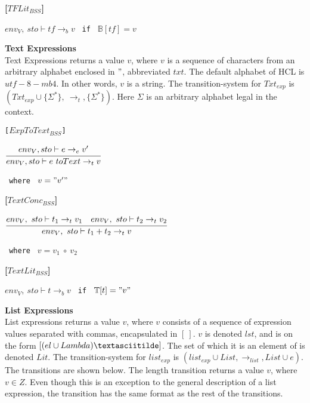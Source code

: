 \textbf{[$TFLit_{BSS}$]}\\
\begin{center}
	\begin{math}
	env_V,\ sto \vdash tf \rightarrow_b v
	\end{math}
	\texttt{ if } $\mathbb{B}[tf] = v$
\end{center}

\textbf{\large{Text Expressions}}\\
Text Expressions returns a value $v$, where $v$ is a sequence of characters from an arbitrary alphabet enclosed in $"$, abbreviated $txt$.
The default alphabet of HCL is $utf-8-mb4$.
In other words, $v$ is a string.
The transition-system for $Txt_{exp}$ is $(Txt_{exp} \cup \{\Sigma^*\},\ \rightarrow_t, \{\Sigma^*\})$.
Here $\Sigma$ is an arbitrary alphabet legal in the context.

\texttt{[$ExpToText_{BSS}$]}\\
\begin{center}
	\begin{math}
	\cfrac
	{env_V, sto \vdash e \rightarrow_{e} v'}
	{env_V, sto \vdash e\ toText \rightarrow_{t} v}
	\end{math}
	
	\texttt{ where } $v = "v'"$
\end{center}

\textbf{[$TextConc_{BSS}$]}\\
\begin{center}
	\begin{math}
	\cfrac
		{env_V,\ sto \vdash t_1 \rightarrow_t v_1 \quad env_V,\ sto \vdash t_2 \rightarrow_t v_2}
		{env_V,\ sto \vdash t_1 + t_2 \rightarrow_t v}
	\end{math}
	
	\texttt{ where } $v = v_1\ \circ\ v_2$
\end{center}

\textbf{[$TextLit_{BSS}$]}\\
\begin{center}
	\begin{math}
	env_V,\ sto \vdash t \rightarrow_b v
	\end{math}
	\texttt{ if } $\mathbb{T}[t] = "v"$
\end{center}

\textbf{\Large{List Expressions}}\\
List expressions returns a value $v$, where $v$ consists of a sequence of expression values separated with commas, encapsulated in $[\ ]$.
$v$ is denoted $lst$, and is on the form $[(el \cup Lambda)\textasciitilde]$.
The set of which it is an element of is denoted $Lit$.
The transition-system for $list_{exp}$ is $(list_{exp} \cup List, \rightarrow_{list}, List \cup e)$.
The transitions are shown below.
The length transition returns a value $v$, where $v \in Z$.
Even though this is an exception to the general description of a list expression, the transition has the same format as the rest of the transitions.

